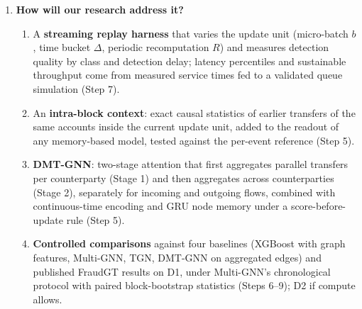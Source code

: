 \documentclass[11pt,a4paper]{article}
\begin{document}
\begin{enumerate}[leftmargin=*]
    \item \textbf{How will our research address it?}
    \begin{enumerate}[leftmargin=*]
        \item A \textbf{streaming replay harness} that varies the update unit (micro-batch $b$, time bucket $\Delta$, periodic recomputation $R$) and measures detection quality by class and detection delay; latency percentiles and sustainable throughput come from measured service times fed to a validated queue simulation (Step 7).
        \item An \textbf{intra-block context}: exact causal statistics of earlier transfers of the same accounts inside the current update unit, added to the readout of any memory-based model, tested against the per-event reference (Step 5).
        \item \textbf{DMT-GNN}: two-stage attention that first aggregates parallel transfers per counterparty (Stage 1) and then aggregates across counterparties (Stage 2), separately for incoming and outgoing flows, combined with continuous-time encoding and GRU node memory under a score-before-update rule (Step 5).
        \item \textbf{Controlled comparisons} against four baselines (XGBoost with graph features, Multi-GNN, TGN, DMT-GNN on aggregated edges) and published FraudGT results on D1, under Multi-GNN's chronological protocol with paired block-bootstrap statistics (Steps 6--9); D2 if compute allows.
    \end{enumerate}
\end{enumerate}
\end{document}
